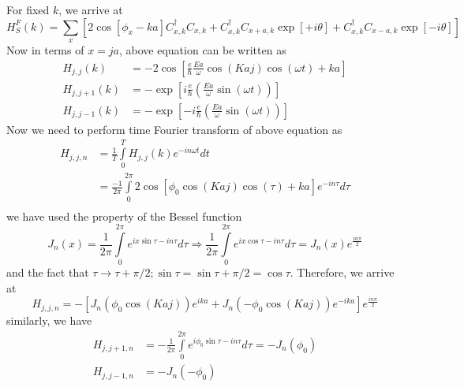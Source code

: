 \documentclass[11pt,letterpaper]{article}
\begin{document}
For fixed $k$, we arrive at
\begin{equation}
		H_{S}^{F}(k)=
	{\displaystyle\sum\limits_{x}}
	\left[  2\cos[\phi_{x}-ka]C_{x,k}^{\dagger}C_{x,k}+C_{x,k}^{\dagger}
	C_{x+a,k}\exp\left[  +i\theta\right]  +C_{x,k}^{\dagger}C_{x-a,k}\exp\left[
	-i\theta\right]  \right]
\end{equation}
Now in terms of $x=ja$, above equation can be written as
\begin{align}
	H_{j,j}(k) &  =-2\cos\left[  \frac{e}{\hbar}\frac{Ea}{\omega}\cos
	(Kaj)\cos(\omega t)+ka\right]  \label{12}\\
	H_{j,j+1}(k) &  =-\exp\left[  i\frac{e}{\hbar}\left(  \frac{Ea}{\omega}
	\sin(\omega t)\right)  \right]  \nonumber\\
	H_{j,j-1}(k) &  =-\exp\left[  -i\frac{e}{\hbar}\left(  \frac{Ea}{\omega}
	\sin(\omega t)\right)  \right]  \nonumber
\end{align}
Now we need to perform time Fourier transform of above equation as
\begin{align}
	H_{j,j,n} &  =\frac{1}{T}
	{\displaystyle\int\limits_{0}^{T}}
	H_{j,j}(k)e^{-in\omega t}dt\\
	&  =\frac{-1}{2\pi}
	{\displaystyle\int\limits_{0}^{2\pi}}
	2\cos\left[  \phi_{0}\cos(Kaj)\cos(\tau)+ka\right]  e^{-in\tau}d\tau
	\nonumber\\
\end{align}
we have used the property of the Bessel function
\begin{equation}
J_{n}(x)  =\frac{1}{2\pi}
{\displaystyle\int\limits_{0}^{2\pi}}
e^{ix\sin\tau-in\tau}d\tau\Longrightarrow\frac{1}{2\pi}
{\displaystyle\int\limits_{0}^{2\pi}}
e^{ix\cos\tau-in\tau}d\tau=J_{n}(x)e^{\frac{in\pi}{2}}
\end{equation}
and the fact that $\tau\rightarrow\tau+\pi/2;\sin\tau=\sin\tau
+\pi/2=\cos\tau$. Therefore, we arrive at
\begin{equation}
	H_{j,j,n}=-\left[  J_{n}\left(  \phi_{0}\cos(Kaj)\right)  e^{ika}+J_{n}\left(
	-\phi_{0}\cos(Kaj)\right)  e^{-ika}\right]  e^{\frac{in\pi}{2}}\label{14}
\end{equation}
similarly, we have
\begin{align}
	H_{j,j+1,n} &  =-\frac{1}{2\pi}
	{\displaystyle\int\limits_{0}^{2\pi}}
	e^{i\phi_{0}\sin\tau-in\tau}d\tau=-J_{n}(\phi_{0})\label{15}\\
	H_{j,j-1,n} &  =-J_{n}(-\phi_{0})\nonumber
\end{align}
\end{document}
